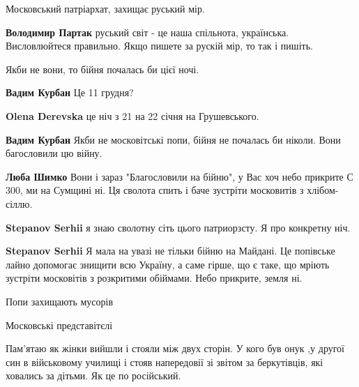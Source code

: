 
 
 
 
 

Московський патріархат, захищає руський мір.

\begin{itemize} %
\textbf{Володимир Партак} руський світ - це наша спільнота, українська. 
Висловлюйтеся правильно. Якщо пишете за рускій мір, то так і пишіть.
\end{itemize} %

Якби не вони, то бійня почалась би цієї ночі.

\begin{itemize} %
\textbf{Вадим Курбан} Це 11 грудня?

\textbf{Olena Derevska} це ніч з 21 на 22 січня на Грушевського.

\textbf{Вадим Курбан} Якби не московітські попи, бійня не почалась би ніколи.
Вони багословили цю війну.

\textbf{Люба Шимко} Вони і зараз "Благословили на бійню", у Вас хоч небо прикрите С 300, ми на Сумщині ні. Ця сволота спить і баче зустріти московитів з хлібом-сіллю.

\textbf{Stepanov Serhii} я знаю сволотну сіть цього патриорзсту. Я про конкретну ніч.

\textbf{Stepanov Serhii} Я мала на увазі не тільки бійню на Майдані.
Це попівське лайно допомогає знищити всю Україну, а саме гірше, що є таке, що мріють зустріти московітів з розкритими обіймами.
Небо прикрите, земля ні.

\end{itemize} %

Попи захищають мусорів

Московські представітєлі


Пам'ятаю як жінки вийшли і стояли між двух сторін. У кого був онук ,у другої
син в військовому училищі і стояв напередовії зі звітом за беркутівців, які
ховались за дітьми. Як це по російський.

